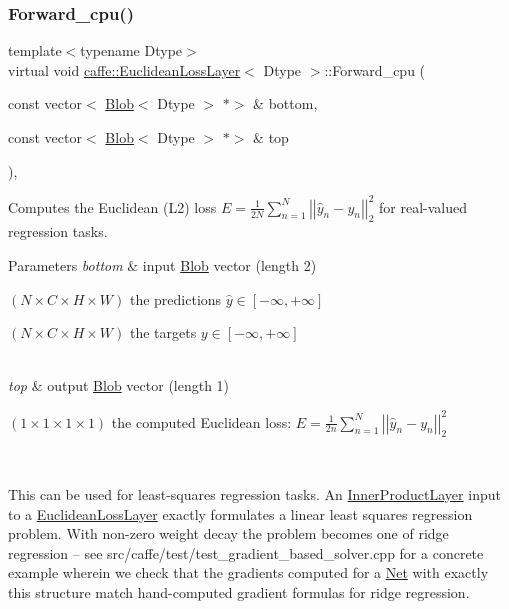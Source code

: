 \subsubsection{\texorpdfstring{Forward\+\_\+cpu()}{Forward\_cpu()}\hspace{0.1cm}{\footnotesize\ttfamily [1/2]}}
{\footnotesize\ttfamily template$<$typename Dtype$>$ \\
virtual void \mbox{\hyperlink{classcaffe_1_1_euclidean_loss_layer}{caffe\+::\+Euclidean\+Loss\+Layer}}$<$ Dtype $>$\+::Forward\+\_\+cpu (\begin{DoxyParamCaption}\item[{const vector$<$ \mbox{\hyperlink{classcaffe_1_1_blob}{Blob}}$<$ Dtype $>$ $\ast$$>$ \&}]{bottom,  }\item[{const vector$<$ \mbox{\hyperlink{classcaffe_1_1_blob}{Blob}}$<$ Dtype $>$ $\ast$$>$ \&}]{top }\end{DoxyParamCaption})\hspace{0.3cm}{\ttfamily [protected]}, {\ttfamily [virtual]}}



Computes the Euclidean (L2) loss $ E = \frac{1}{2N} \sum\limits_{n=1}^N \left| \left| \hat{y}_n - y_n \right| \right|_2^2 $ for real-\/valued regression tasks. 


\begin{DoxyParams}{Parameters}
{\em bottom} & input \mbox{\hyperlink{classcaffe_1_1_blob}{Blob}} vector (length 2)
\begin{DoxyEnumerate}
\item $ (N \times C \times H \times W) $ the predictions $ \hat{y} \in [-\infty, +\infty]$
\item $ (N \times C \times H \times W) $ the targets $ y \in [-\infty, +\infty]$ 
\end{DoxyEnumerate}\\
\hline
{\em top} & output \mbox{\hyperlink{classcaffe_1_1_blob}{Blob}} vector (length 1)
\begin{DoxyEnumerate}
\item $ (1 \times 1 \times 1 \times 1) $ the computed Euclidean loss\+: $ E = \frac{1}{2n} \sum\limits_{n=1}^N \left| \left| \hat{y}_n - y_n \right| \right|_2^2 $
\end{DoxyEnumerate}\\
\hline
\end{DoxyParams}
This can be used for least-\/squares regression tasks. An \mbox{\hyperlink{classcaffe_1_1_inner_product_layer}{Inner\+Product\+Layer}} input to a \mbox{\hyperlink{classcaffe_1_1_euclidean_loss_layer}{Euclidean\+Loss\+Layer}} exactly formulates a linear least squares regression problem. With non-\/zero weight decay the problem becomes one of ridge regression -- see src/caffe/test/test\+\_\+gradient\+\_\+based\+\_\+solver.\+cpp for a concrete example wherein we check that the gradients computed for a \mbox{\hyperlink{classcaffe_1_1_net}{Net}} with exactly this structure match hand-\/computed gradient formulas for ridge regression.

